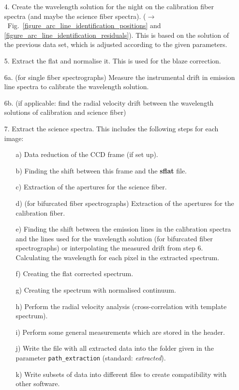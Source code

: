 \documentclass[10pt,a4paper]{article}
\begin{document}
\begin{itemize}
  \item[4.] Create the wavelength solution for the night on the calibration fiber spectra (and maybe the science fiber spectra). ($\rightarrow$~Fig.~\ref{figure_arc_line_identification_positions} and \ref{figure_arc_line_identification_residuals}). This is based on the solution of the previous data set, which is adjusted according to the given parameters.
  \item[5.] Extract the flat and normalise it. This is used for the blaze correction.
  \item[6a.] (for single fiber spectrographs) Measure the instrumental drift in emission line spectra to calibrate the wavelength solution.
  \item[6b.] (if applicable: find the radial velocity drift between the wavelength solutions of calibration and science fiber)
  \item[7.] Extract the science spectra. This includes the following steps for each image:
  \begin{itemize}
    \item[a)] Data reduction of the CCD frame (if set up).
    \item[b)] Finding the shift between this frame and the \textbf{sflat} file.
    \item[c)] Extraction of the apertures for the science fiber.
    \item[d)] (for bifurcated fiber spectrographs) Extraction of the apertures for the calibration fiber.
    \item[e)] Finding the shift between the emission lines in the calibration spectra and the lines used for the wavelength solution (for bifurcated fiber spectrographs) or interpolating the measured drift from step 6. Calculating the wavelength for each pixel in the extracted spectrum.
    \item[f)] Creating the flat corrected spectrum.
    \item[g)] Creating the spectrum with normalised continuum.
    \item[h)] Perform the radial velocity analysis (cross-correlation with template spectrum).
    \item[i)] Perform some general measurements which are stored in the header.
    \item[j)] Write the file with all extracted data into the folder given in the parameter \verb|path_extraction| (standard: \textit{extracted}).
    \item[k)] Write subsets of data into different files to create compatibility with other software.
  \end{itemize}
\end{itemize}
\end{document}
